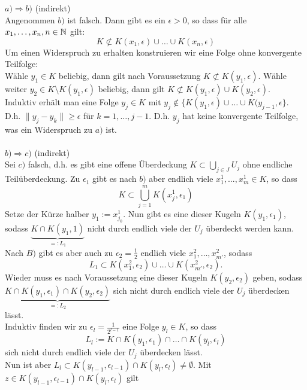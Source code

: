 \begin{beweis}
	$a) \Rightarrow  b)$ (indirekt) \\
	Angenommen $b)$ ist falsch. Dann gibt es ein $\epsilon > 0$, so dass für alle $x_{1}, \dotsc, x_{n}, n \in \mathbb{N}$ gilt:
	\[ K \not\subset K(x_{1}, \epsilon) \cup \dotsc \cup K(x_{n}, \epsilon) \]
	Um einen Widerspruch zu erhalten konstruieren wir eine Folge ohne konvergente Teilfolge: \\
	Wähle $y_{1} \in K$ beliebig, dann gilt nach Voraussetzung $K \not\subset K(y_{1}, \epsilon)$.
	Wähle weiter $y_{2} \in K \setminus K(y_{1}, \epsilon)$ beliebig, dann gilt $K \not\subset K(y_{1}, \epsilon) \cup K(y_{2}, \epsilon)$. \\
	Induktiv erhält man eine Folge $y_{j} \in K$ mit $y_{j} \notin \{ K(y_{1}, \epsilon) \cup \dotsc \cup K(y_{j - 1}, \epsilon \}$. \\
	D.h. $\|y_{j} - y_{k} \| \geq \epsilon$ für $k = 1, \dotsc, j - 1$. D.h. $y_{j}$ hat keine konvergente Teilfolge, was ein Widerspruch zu $a)$ ist. \\ \\
	$b) \Rightarrow c)$ (indirekt) \\
	Sei $c)$ falsch, d.h. es gibt eine offene Überdeckung $K \subset \bigcup_{j \in J} U_{j}$ ohne endliche Teilüberdeckung.
	Zu $\epsilon_{1}$ gibt es nach $b)$ aber endlich viele $x_{1}^{1}, ..., x_{m}^{1} \in K$, so dass 
	\[ K \subset \bigcup_{j = 1}^{m} K(x_{j}^{1}, \epsilon_{1}) \]
	Setze der Kürze halber $y_{1} := x_{j_{0}}^{1}$. Nun gibt es eine dieser Kugeln $K(y_{1}, \epsilon_{1})$, sodass $\underbrace{K \cap K(y_{1}, 1)}_{=: L_{1}}$ nicht durch endlich viele der $U_{j}$ überdeckt werden kann. \\
	Nach $B)$ gibt es aber auch zu $\epsilon_{2} = \frac{1}{2}$ endlich viele $x_{1}^{2}, \dotsc, x_{m'}^{2}$, sodass 
	\[ L_{1} \subset K(x_{1}^{2}, \epsilon_{2}) \cup \dotsc \cup K(x_{m'}^{2}, \epsilon_{2}). \] 
	Wieder muss es nach Voraussetzung eine dieser Kugeln $K(y_{2}, \epsilon_{2})$ geben, sodass $\underbrace{K \cap K(y_{1}, \epsilon_{1}) \cap K(y_{2}, \epsilon_{2})}_{=: L_{2}}$ sich nicht durch endlich viele der $U_{j}$ überdecken lässt. \\
	Induktiv finden wir zu $\epsilon_{l} = \frac{1}{2^{l - 1}}$ eine Folge $y_{l} \in K$, so dass
	\[ L_{l} := K \cap K(y_{1}, \epsilon_{1}) \cap \dotsc \cap K(y_{l}, \epsilon_{l}) \]
	sich nicht durch endlich viele der $U_{j}$ überdecken lässt. \\
	Nun ist aber $L_{l} \subset K(y_{l - 1}, \epsilon_{l - 1}) \cap K(y_{l}, \epsilon_{l}) \neq \emptyset$. Mit $z \in K(y_{l - 1}, \epsilon_{l - 1}) \cap K(y_{l}, \epsilon_{l})$ gilt

\end{beweis}
